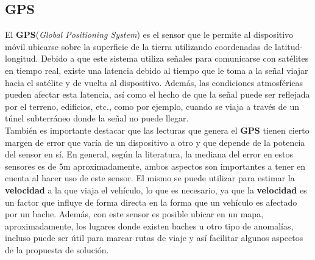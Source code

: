 	\subsection{GPS}
		El \textbf{GPS}(\emph{Global Positioning System}) es el sensor que le permite al dispositivo móvil ubicarse sobre la
		superficie de la tierra utilizando coordenadas de latitud-longitud. Debido a que este sistema utiliza señales para
		comunicarse con satélites en tiempo real, existe una latencia debido al tiempo que le toma a la señal viajar hacia el
		satélite y de vuelta al dispositivo. Además, las condiciones atmosféricas pueden afectar esta latencia, así como el hecho
		de que la señal puede ser reflejada por el terreno, edificios, etc., como por ejemplo, cuando se viaja a través de un
		túnel subterráneo donde la señal no puede llegar.\\
		\indent También es importante destacar que las lecturas que genera el \textbf {GPS} tienen cierto margen de error que varía
		de un dispositivo a otro y que depende de la potencia del sensor en sí. En general, según la literatura, la mediana del error
		en estos sensores es de 5m aproximadamente, ambos aspectos son importantes a tener en cuenta
		al hacer uso de este sensor. El mismo se puede utilizar para estimar la \textbf{velocidad} a la que viaja el vehículo, lo que
		es necesario, ya que la \textbf{velocidad} es un factor que influye de forma directa en la forma que un vehículo es afectado por
		un bache. Además, con este sensor es posible ubicar en un mapa, aproximadamente, los lugares donde existen baches u otro tipo
		de anomalías, incluso puede ser útil para marcar rutas de viaje y así facilitar algunos aspectos de la propuesta de solución.

